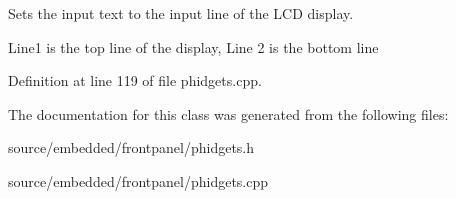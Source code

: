 Sets the input text to the input line of the L\-C\-D display. 

Line1 is the top line of the display, Line 2 is the bottom line 

Definition at line 119 of file phidgets.\-cpp.



The documentation for this class was generated from the following files\-:\begin{DoxyCompactItemize}
\item 
source/embedded/frontpanel/phidgets.\-h\item 
source/embedded/frontpanel/phidgets.\-cpp\end{DoxyCompactItemize}
